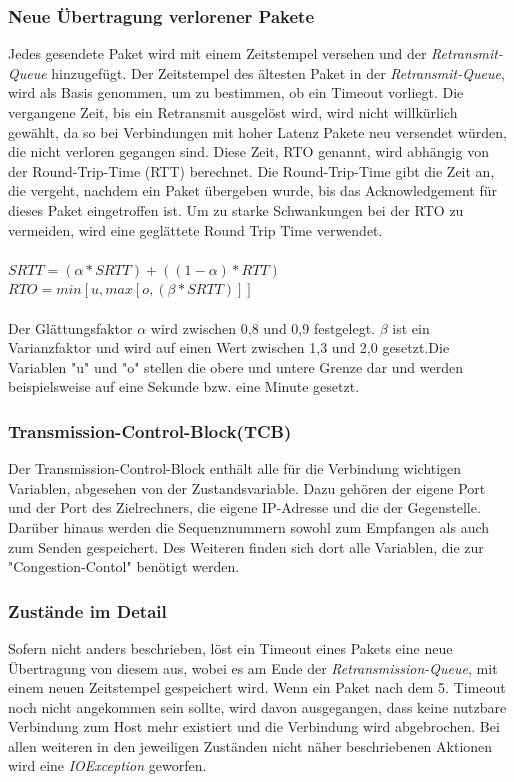 \subsubsection{Neue Übertragung verlorener Pakete}
Jedes gesendete Paket wird mit einem Zeitstempel versehen und der \textit{Retransmit-Queue} hinzugefügt. Der Zeitstempel des ältesten Paket in der \textit{Retransmit-Queue}, wird als Basis genommen, um zu bestimmen, ob ein Timeout vorliegt. Die vergangene Zeit, bis ein Retransmit ausgelöst wird, wird nicht willkürlich gewählt, da so bei Verbindungen mit hoher Latenz Pakete neu versendet würden, die nicht verloren gegangen sind. Diese Zeit, RTO genannt, wird abhängig von der Round-Trip-Time (RTT) berechnet. Die Round-Trip-Time gibt die Zeit an, die vergeht, nachdem ein Paket übergeben wurde, bis das Acknowledgement für dieses Paket eingetroffen ist.  Um zu starke Schwankungen bei der RTO zu vermeiden, wird eine geglättete Round Trip Time verwendet. \\\\
$SRTT = (\alpha * SRTT) + ((1-\alpha)*RTT)$\\
$RTO = min [u, max [o, (\beta *SRTT)]]$\\\\
Der Glättungsfaktor $\alpha$ wird zwischen 0,8 und 0,9 festgelegt. $\beta$ ist ein Varianzfaktor und wird auf einen Wert zwischen 1,3 und 2,0 gesetzt.Die Variablen "{}u"{} und "{}o"{} stellen die obere und untere Grenze dar und werden beispielsweise auf eine Sekunde bzw. eine Minute gesetzt.


\subsubsection{Transmission-Control-Block(TCB)}

Der Transmission-Control-Block enthält alle für die Verbindung wichtigen Variablen, abgesehen von der Zustandsvariable.  Dazu gehören der eigene Port und der Port des Zielrechners, die eigene IP-Adresse und die der Gegenstelle. Darüber hinaus werden die Sequenznummern sowohl zum Empfangen als auch zum Senden gespeichert.  Des Weiteren finden sich dort alle Variablen, die zur "{}Congestion-Contol"{} benötigt werden.  


\subsubsection{Zustände im Detail}
Sofern nicht anders beschrieben, löst ein Timeout eines Pakets eine neue Übertragung von diesem aus, wobei es am Ende der \textit{Retransmission-Queue}, mit einem neuen Zeitstempel gespeichert wird. Wenn ein Paket nach dem 5. Timeout noch nicht angekommen sein sollte, wird davon ausgegangen, dass keine nutzbare Verbindung zum Host mehr existiert und die Verbindung wird abgebrochen. 
Bei allen weiteren in den jeweiligen Zuständen nicht näher beschriebenen Aktionen wird eine \textit{IOException} geworfen.

